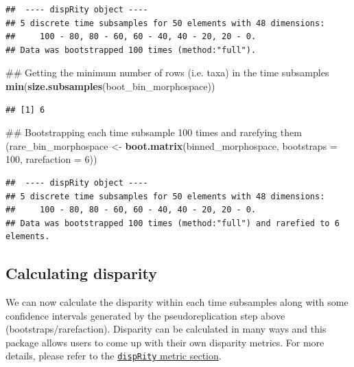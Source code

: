 \documentclass[]{book}
\newenvironment{Shaded}{\begin{snugshade}}{\end{snugshade}}
\newcommand{\KeywordTok}[1]{\textcolor[rgb]{0.13,0.29,0.53}{\textbf{#1}}}
\newcommand{\DataTypeTok}[1]{\textcolor[rgb]{0.13,0.29,0.53}{#1}}
\newcommand{\DecValTok}[1]{\textcolor[rgb]{0.00,0.00,0.81}{#1}}
\newcommand{\StringTok}[1]{\textcolor[rgb]{0.31,0.60,0.02}{#1}}
\newcommand{\NormalTok}[1]{#1}
\theoremstyle{definition}
\theoremstyle{definition}
\theoremstyle{remark}
\begin{document}
\begin{verbatim}
##  ---- dispRity object ---- 
## 5 discrete time subsamples for 50 elements with 48 dimensions:
##     100 - 80, 80 - 60, 60 - 40, 40 - 20, 20 - 0.
## Data was bootstrapped 100 times (method:"full").
\end{verbatim}

\begin{Shaded}
\begin{Highlighting}[]
\NormalTok{## Getting the minimum number of rows (i.e. taxa) in the time subsamples}
\KeywordTok{min}\NormalTok{(}\KeywordTok{size.subsamples}\NormalTok{(boot_bin_morphospace))}
\end{Highlighting}
\end{Shaded}

\begin{verbatim}
## [1] 6
\end{verbatim}

\begin{Shaded}
\begin{Highlighting}[]
\NormalTok{## Bootstrapping each time subsample 100 times and rarefying them }
\NormalTok{(rare_bin_morphospace <-}\StringTok{ }\KeywordTok{boot.matrix}\NormalTok{(binned_morphospace, }\DataTypeTok{bootstraps =} \DecValTok{100}\NormalTok{,}
    \DataTypeTok{rarefaction =} \DecValTok{6}\NormalTok{))}
\end{Highlighting}
\end{Shaded}

\begin{verbatim}
##  ---- dispRity object ---- 
## 5 discrete time subsamples for 50 elements with 48 dimensions:
##     100 - 80, 80 - 60, 60 - 40, 40 - 20, 20 - 0.
## Data was bootstrapped 100 times (method:"full") and rarefied to 6 elements.
\end{verbatim}

\subsection{Calculating disparity}\label{calculating-disparity}

We can now calculate the disparity within each time subsamples along
with some confidence intervals generated by the pseudoreplication step
above (bootstraps/rarefaction). Disparity can be calculated in many ways
and this package allows users to come up with their own disparity
metrics. For more details, please refer to the
\protect\hyperlink{disparity-metrics}{\texttt{dispRity} metric section}.
\end{document}
